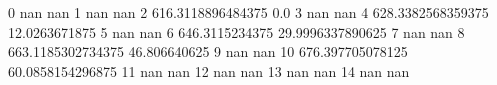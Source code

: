 0 nan nan
1 nan nan
2 616.3118896484375 0.0
3 nan nan
4 628.3382568359375 12.0263671875
5 nan nan
6 646.3115234375 29.9996337890625
7 nan nan
8 663.1185302734375 46.806640625
9 nan nan
10 676.397705078125 60.0858154296875
11 nan nan
12 nan nan
13 nan nan
14 nan nan
